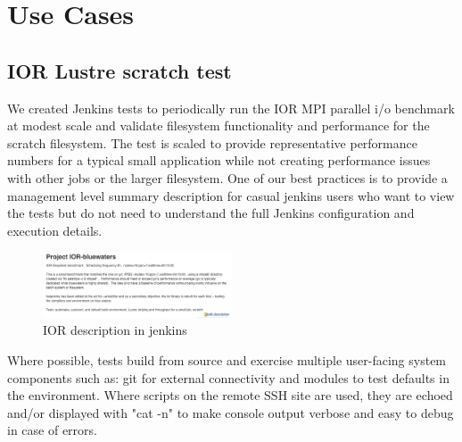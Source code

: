 \documentclass[10pt, conference, compsocconf]{IEEEtran}
\begin{document}
\section{Use Cases}
\label{sec:UseCases}
\subsection{IOR Lustre scratch test}
We created Jenkins tests to periodically run the IOR MPI parallel i/o benchmark at modest scale and validate filesystem functionality and performance for the scratch filesystem. 
The test is scaled to provide representative performance numbers for a typical small application while not creating performance issues with other jobs or the larger filesystem. 
 One of our best practices is to provide a management level summary description for casual jenkins users who want to view the tests but do not need to understand the full Jenkins configuration and execution details. 
 
\begin{figure}[H]
\centering
\includegraphics[width=0.5\textwidth]{IOR-bluewaters-descr}
\caption{ IOR description in jenkins }
\label{fig:IOR-bluewaters-descr}
\end{figure}
Where possible, tests build from source and exercise multiple user-facing system components such as: git for external connectivity and modules to test defaults in the environment. 
 Where scripts on the remote SSH site are used, they are echoed and/or displayed with "cat -n" to make console output verbose and easy to debug in case of errors. 
 
\end{document}
